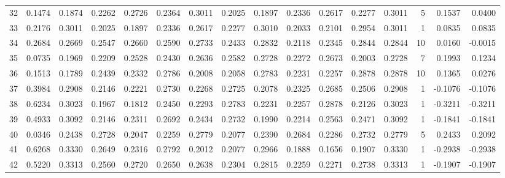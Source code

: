\begin{tabular}{lrrrrrrrrrrrrrrr}
32  &      0.1474 &  0.1874 &  0.2262 &  0.2726 &  0.2364 &  0.3011 &  0.2025 &  0.1897 &  0.2336 &  0.2617 &   0.2277 &     0.3011 &      5 &                    0.1537 &                     0.0400 \\
33  &      0.2176 &  0.3011 &  0.2025 &  0.1897 &  0.2336 &  0.2617 &  0.2277 &  0.3010 &  0.2033 &  0.2101 &   0.2954 &     0.3011 &      1 &                    0.0835 &                     0.0835 \\
34  &      0.2684 &  0.2669 &  0.2547 &  0.2660 &  0.2590 &  0.2733 &  0.2433 &  0.2832 &  0.2118 &  0.2345 &   0.2844 &     0.2844 &     10 &                    0.0160 &                    -0.0015 \\
35  &      0.0735 &  0.1969 &  0.2209 &  0.2528 &  0.2430 &  0.2636 &  0.2582 &  0.2728 &  0.2272 &  0.2673 &   0.2003 &     0.2728 &      7 &                    0.1993 &                     0.1234 \\
36  &      0.1513 &  0.1789 &  0.2439 &  0.2332 &  0.2786 &  0.2008 &  0.2058 &  0.2783 &  0.2231 &  0.2257 &   0.2878 &     0.2878 &     10 &                    0.1365 &                     0.0276 \\
37  &      0.3984 &  0.2908 &  0.2146 &  0.2221 &  0.2730 &  0.2268 &  0.2725 &  0.2078 &  0.2325 &  0.2685 &   0.2506 &     0.2908 &      1 &                   -0.1076 &                    -0.1076 \\
38  &      0.6234 &  0.3023 &  0.1967 &  0.1812 &  0.2450 &  0.2293 &  0.2783 &  0.2231 &  0.2257 &  0.2878 &   0.2126 &     0.3023 &      1 &                   -0.3211 &                    -0.3211 \\
39  &      0.4933 &  0.3092 &  0.2146 &  0.2311 &  0.2692 &  0.2434 &  0.2732 &  0.1990 &  0.2214 &  0.2563 &   0.2471 &     0.3092 &      1 &                   -0.1841 &                    -0.1841 \\
40  &      0.0346 &  0.2438 &  0.2728 &  0.2047 &  0.2259 &  0.2779 &  0.2077 &  0.2390 &  0.2684 &  0.2286 &   0.2732 &     0.2779 &      5 &                    0.2433 &                     0.2092 \\
41  &      0.6268 &  0.3330 &  0.2649 &  0.2316 &  0.2792 &  0.2012 &  0.2077 &  0.2966 &  0.1888 &  0.1656 &   0.1907 &     0.3330 &      1 &                   -0.2938 &                    -0.2938 \\
42  &      0.5220 &  0.3313 &  0.2560 &  0.2720 &  0.2650 &  0.2638 &  0.2304 &  0.2815 &  0.2259 &  0.2271 &   0.2738 &     0.3313 &      1 &                   -0.1907 &                    -0.1907 \\

\end{tabular}
